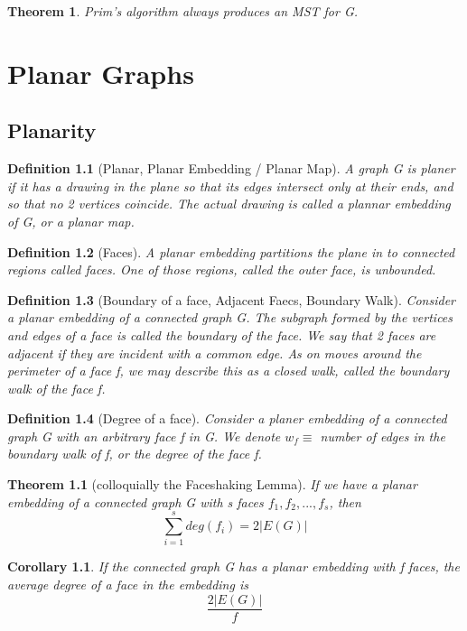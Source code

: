 \documentclass[11pt, oneside]{book}
\theoremstyle{break}
\newtheorem{thm}{Theorem}[section]
\newtheorem{crly}{Corollary}[thm]
\newtheorem{defn}{Definition}[section]
\begin{document}
\begin{thm}
	Prim's algorithm always produces an MST for G.
\end{thm}



\chapter{Planar Graphs}


\section{Planarity}

\begin{defn}[Planar, Planar Embedding / Planar Map]
	A graph G is planer if it has a drawing in the plane so that its edges intersect only at their ends, and so that no 2 vertices coincide. The actual drawing is called a plannar embedding of G, or a planar map.
\end{defn}

\begin{defn}[Faces]
	A planar embedding partitions the plane in to connected regions called faces. One of those regions, called the outer face, is unbounded.
\end{defn}


\begin{defn}[Boundary of a face, Adjacent Faecs, Boundary Walk]
	Consider a planar embedding of a connected graph G. The subgraph formed by the vertices and edges of a face is called the boundary of the face. We say that 2 faces are adjacent if they are incident with a common edge. As on moves around the perimeter of a face f, we may describe this as a closed walk, called the boundary walk of the face f.
\end{defn}

\begin{defn}[Degree of a face]
	Consider a planer embedding of a connected graph G with an arbitrary face f in G. We denote $w_f \equiv$ number of edges in the boundary walk of f, or the degree of the face f.
\end{defn}

\begin{thm}[colloquially the Faceshaking Lemma]
	If we have a planar embedding of a connected graph G with s faces $f_1, f_2, ..., f_s$, then
	\[
		\sum_{i=1}^{s}deg(f_i) = 2| E(G) |	
	\]
\end{thm}

\begin{crly}
	If the connected graph G has a planar embedding with f faces, the average degree of a face in the embedding is
	\[
		\frac{2|E(G)|}{f}
	\]
\end{crly}
\end{document}
